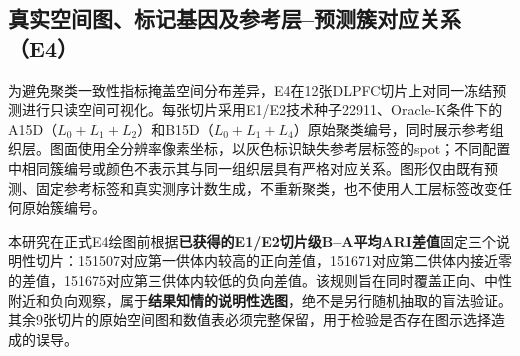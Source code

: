 \subsection{真实空间图、标记基因及参考层--预测簇对应关系（E4）}
\label{subsec:cellcharter-e4-v1}

为避免聚类一致性指标掩盖空间分布差异，E4在12张DLPFC切片上对同一冻结预测进行只读空间可视化。每张切片采用E1/E2技术种子22911、Oracle-K条件下的A15D（$L_0+L_1+L_2$）和B15D（$L_0+L_1+L_4$）原始聚类编号，同时展示参考组织层。图面使用全分辨率像素坐标，以灰色标识缺失参考层标签的spot；不同配置中相同簇编号或颜色不表示其与同一组织层具有严格对应关系。图形仅由既有预测、固定参考标签和真实测序计数生成，不重新聚类，也不使用人工层标签改变任何原始簇编号。

本研究在正式E4绘图前根据\textbf{已获得的E1/E2切片级B--A平均ARI差值}固定三个说明性切片：151507对应第一供体内较高的正向差值，151671对应第二供体内接近零的差值，151675对应第三供体内较低的负向差值。该规则旨在同时覆盖正向、中性附近和负向观察，属于\textbf{结果知情的说明性选图}，绝不是另行随机抽取的盲法验证。其余9张切片的原始空间图和数值表必须完整保留，用于检验是否存在图示选择造成的误导。

